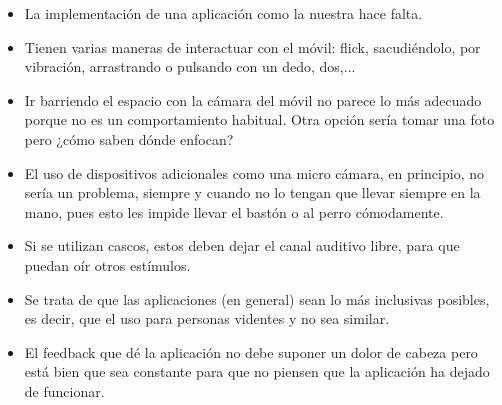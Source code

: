 \documentclass{article}
\begin{document}
	\begin{itemize}
		\item La implementación de una aplicación como la nuestra hace falta.
		\item Tienen varias maneras de interactuar con el móvil: flick, sacudiéndolo, por vibración, arrastrando o pulsando con un dedo, dos,...
		\item Ir barriendo el espacio con la cámara del móvil no parece lo más adecuado porque no es un comportamiento habitual. Otra opción sería tomar una foto pero ¿cómo saben dónde enfocan?
		\item El uso de dispositivos adicionales como una micro cámara, en principio, no sería un problema, siempre y cuando no lo tengan que llevar siempre en la mano, pues esto les impide llevar el bastón o al perro cómodamente.
		\item Si se utilizan cascos, estos deben dejar el canal auditivo libre, para que puedan oír otros estímulos.
		\item Se trata de que las aplicaciones (en general) sean lo más inclusivas posibles, es decir, que el uso para personas videntes y no sea similar.
		\item El feedback que dé la aplicación no debe suponer un dolor de cabeza pero está bien que sea constante para que no piensen que la aplicación ha dejado de funcionar.
	\end{itemize}
	
	
	
\end{document}

